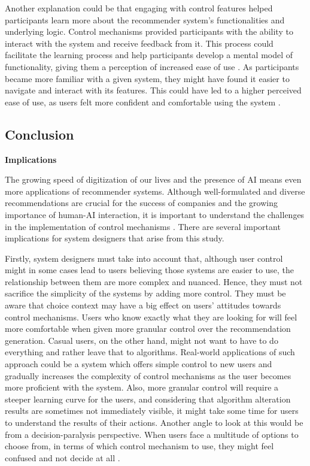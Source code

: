 \documentclass[a4paper,12pt]{article}
\begin{document}
Another explanation could be that engaging with control features helped participants learn more about the recommender system's functionalities and underlying logic. Control mechanisms provided participants with the ability to interact with the system and receive feedback from it. This process could facilitate the learning process and help participants develop a mental model of functionality, giving them a perception of increased ease of use \citep{norman2013design}. As participants became more familiar with a given system, they might have found it easier to navigate and interact with its features. This could have led to a higher perceived ease of use, as users felt more confident and comfortable using the system \citep{venkateshDeterminantsPerceivedEase2000}. 

\subsection{Conclusion}

\textbf{Implications}

The growing speed of digitization of our lives and the presence of AI means even more applications of recommender systems. Although well-formulated and diverse recommendations are crucial for the success of companies and the growing importance of human-AI interaction, it is important to understand the challenges in the implementation of control mechanisms \citep{dietvorstEtAl18, songWhenHowDiversify2019}. There are several important implications for system designers that arise from this study.

Firstly, system designers must take into account that, although user control might in some cases lead to users believing those systems are easier to use, the relationship between them are more complex and nuanced. Hence, they must not sacrifice the simplicity of the systems by adding more control. They must be aware that choice context may have a big effect on users' attitudes towards control mechanisms. Users who know exactly what they are looking for will feel more comfortable when given more granular control over the recommendation generation. Casual users, on the other hand, might not want to have to do everything and rather leave that to algorithms. Real-world applications of such approach could be a system which offers simple control to new users and gradually increases the complexity of control mechanisms as the user becomes more proficient with the system. Also, more granular control will require a steeper learning curve for the users, and considering that algorithm alteration results are sometimes not immediately visible, it might take some time for users to understand the results of their actions. Another angle to look at this would be from a decision-paralysis perspective. When users face a multitude of options to choose from, in terms of which control mechanism to use, they might feel confused and not decide at all \citep{schwartz2004paradox}.
\end{document}
